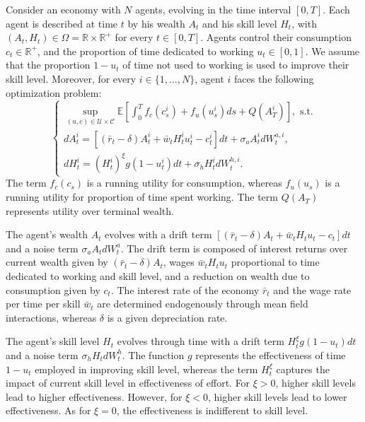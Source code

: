 Consider an economy with $N$ agents, evolving in the time interval $[0,T]$.
Each agent is described at time $t$ by his wealth $A_t$ and his skill level $H_t$,
with $(A_t, H_t) \in \Omega = \mathbb{R} \times \mathbb{R}^+$ for every $t \in [0,T]$.
Agents control their consumption $c_t \in \mathbb{R}^+$, and the proportion of time dedicated to working $u_t \in [0,1]$. 
We assume that the proportion $1 - u_t$ of time not used to working is used to improve their skill level. 
Moreover, for every $i \in \{1,...,N\}$,  agent $i$ faces the following optimization problem:
\begin{equation}\label{education_model:representative_agent_optimization}
\begin{cases}
        \sup\limits_{(u,c) \in \mathcal{U} \times \mathcal{C}}\mathbb{E} [ \int_0^T f_c(c^i_s) + f_u(u^i_s) ds + Q(A^i_T) ], \text{ s.t.}\\
        d A^i_t = \left[ (\bar r_t - \delta) A^i_t + \bar w_t H^i_t u^i_t - c^i_t  \right] dt + \sigma_a A^i_t d W^{a,i}_t,\\
        d H^i_t = (H^i_t)^\xi g(1 - u^i_t) dt + \sigma_h H^i_t d W^{h,i}_t.
\end{cases}
\end{equation}
The term $f_c(c_s)$ is a running utility for consumption, whereas $f_u(u_s)$ is a running utility for proportion of time spent working.
The term $Q(A_T)$ represents utility over terminal wealth.

The agent's wealth $A_t$ evolves with a drift term $\left[ (\bar r_t - \delta) A_t + \bar w_t H_t u_t - c_t  \right] dt $ and a noise term $\sigma_a A_t d W^a_t$.
The drift term is composed of interest returns over current wealth given by $(\bar r_t - \delta) A_t$, wages $\bar w_t H_t u_t$  proportional to time dedicated to working and skill level, and a reduction on wealth due to consumption given by $c_t$. The interest rate of the economy $\bar r_t$ and the wage rate per time per skill $\bar w_t$  are determined endogenously through mean field interactions, whereas $\delta$ is a given depreciation rate. 

The agent's skill level $H_t$ evolves through time with a drift term $H^\xi_t g(1 - u_t) dt$ and a noise term $\sigma_h H_t dW^h_t$.
The function $g$ represents the effectiveness of time $1 - u_t$ employed in improving skill level,
 whereas the term $H_t^\xi$ captures the impact of current skill level in effectiveness of effort.
 For $\xi > 0$, higher skill levels lead to higher effectiveness.
  However, for $\xi < 0$, higher skill levels lead to lower effectiveness.
  As for $\xi = 0$, the effectiveness is indifferent to skill level.

